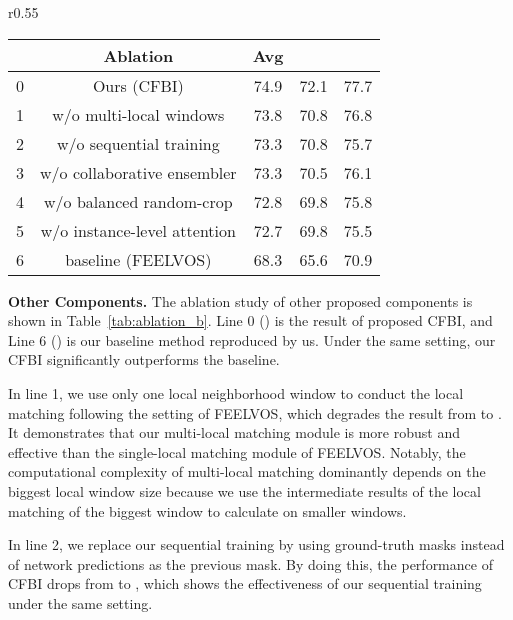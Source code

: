 \documentclass[runningheads]{llncs}
\begin{document}
\setlength{\intextsep}{-3pt}
\begin{wraptable}[11]{r}{0.55\textwidth}

\centering
\caption{Ablation of other components.}\label{tab:ablation_b}
\begin{tabular}{l c c c c}
    \toprule[1.5pt]
          & Ablation & Avg &  &  \\
    \midrule[1pt]
        0  & Ours (CFBI) & 74.9 & 72.1 & 77.7 \\
    \hline
        1  & w/o multi-local windows & 73.8 & 70.8 & 76.8 \\
        2  & w/o sequential training & 73.3 & 70.8 & 75.7 \\
        3  & w/o collaborative ensembler & 73.3 & 70.5 & 76.1 \\
4  & w/o balanced random-crop & 72.8 & 69.8 & 75.8 \\
        5  & w/o instance-level attention & 72.7 & 69.8 & 75.5 \\
\hline
        6  & baseline (FEELVOS) & 68.3 & 65.6 & 70.9 \\
    \bottomrule[1.5pt]
\end{tabular}
\end{wraptable}

\noindent \textbf{Other Components.} The ablation study of other proposed components is shown in Table~\ref{tab:ablation_b}. Line 0 () is the result of proposed CFBI, and Line 6 () is our baseline method reproduced by us. Under the same setting, our CFBI significantly outperforms the baseline.



In line 1, we use only one local neighborhood window to conduct the local matching following the setting of FEELVOS, which degrades the result from  to . It demonstrates that our multi-local matching module is more robust and effective than the single-local matching module of FEELVOS. Notably, the computational complexity of multi-local matching dominantly depends on the biggest local window size because we use the intermediate results of the local matching of the biggest window to calculate on smaller windows.



In line 2, we replace our sequential training by using ground-truth masks instead of network predictions as the previous mask. By doing this, the performance of CFBI drops from  to , which shows the effectiveness of our sequential training under the same setting.
\end{document}
